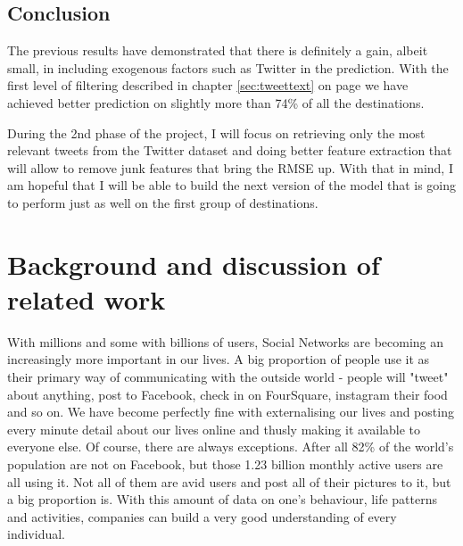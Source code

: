 \documentclass[minf,frontabs,twoside,singlespacing,parskip]{infthesis}
\begin{document}
%

\section{Conclusion}

The previous results have demonstrated that there is definitely a gain, albeit small, in including exogenous factors such as Twitter in the prediction. With the first level of filtering described in chapter \ref{sec:tweettext} on page \pageref{sec:tweettext} we have achieved better prediction on slightly more than 74\% of all the destinations.  


During the 2nd phase of the project, I will focus on retrieving only the most relevant tweets from the Twitter dataset and doing better feature extraction that will allow to remove junk features that bring the RMSE up. With that in mind, I am hopeful that I will be able to build the next version of the model that is going to perform just as well on the first group of destinations. 



\chapter{Background and discussion of related work}


With millions and some with billions of users, Social Networks are becoming an increasingly more important in our lives. A big proportion of people use it as their primary way of communicating with the outside world - people will "tweet" about anything, post to Facebook, check in on FourSquare, instagram their food and so on. We have become perfectly fine with externalising our lives and posting every minute detail about our lives online and thusly making it available to everyone else. 
Of course, there are always exceptions. After all 82\% of the world's population are not on Facebook, but those 1.23 billion monthly active users are all using it. Not all of them are avid users and post all of their pictures to it, but a big proportion is. With this amount of data on one's behaviour, life patterns and activities, companies can build a very good understanding of every individual. 
\end{document}

